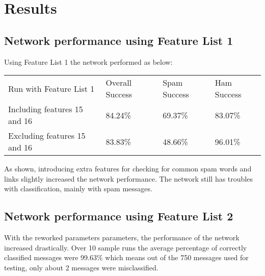
\section{Results}
  \subsection{Network performance using Feature List 1}
  \label{sec:initialresults}
    Using Feature List 1 the network performed as below:
    \begin{table}[H]
      \begin{tabular}{llll}
        Run with Feature List 1      & Overall Success & Spam Success & Ham Success \\
        Including features 15 and 16 & 84.24\%         & 69.37\%      & 83.07\%     \\
        Excluding features 15 and 16 & 83.83\%         & 48.66\%      & 96.01\%    
      \end{tabular}
    \end{table}
    As shown, introducing extra features for checking for common spam words and
    links slightly increased the network performance. The network still has
    troubles with classification, mainly with spam messages.

  \subsection{Network performance using Feature List 2}
  \label{sec:reworkedresults}
    With the reworked parameters parameters, the performance of the network
    increased drastically. Over 10 sample runs the average percentage of
    correctly classified messages were 99.63\% which means out of the 750
    messages used for testing, only about 2 messages were misclassified. 

